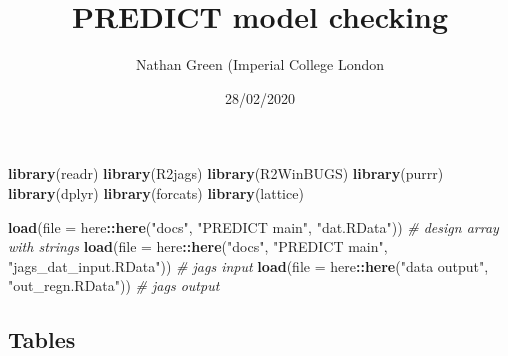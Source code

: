 \documentclass[]{article}
\title{PREDICT model checking}
\author{Nathan Green (Imperial College London}
\date{28/02/2020}
\newenvironment{Shaded}{\begin{snugshade}}{\end{snugshade}}
\newcommand{\CommentTok}[1]{\textcolor[rgb]{0.56,0.35,0.01}{\textit{#1}}}
\newcommand{\DataTypeTok}[1]{\textcolor[rgb]{0.13,0.29,0.53}{#1}}
\newcommand{\KeywordTok}[1]{\textcolor[rgb]{0.13,0.29,0.53}{\textbf{#1}}}
\newcommand{\NormalTok}[1]{#1}
\newcommand{\OperatorTok}[1]{\textcolor[rgb]{0.81,0.36,0.00}{\textbf{#1}}}
\newcommand{\StringTok}[1]{\textcolor[rgb]{0.31,0.60,0.02}{#1}}
\begin{document}
\maketitle

\begin{Shaded}
\begin{Highlighting}[]
\KeywordTok{library}\NormalTok{(readr)}
\KeywordTok{library}\NormalTok{(R2jags)}
\KeywordTok{library}\NormalTok{(R2WinBUGS)}
\KeywordTok{library}\NormalTok{(purrr)}
\KeywordTok{library}\NormalTok{(dplyr)}
\KeywordTok{library}\NormalTok{(forcats)}
\KeywordTok{library}\NormalTok{(lattice)}
\end{Highlighting}
\end{Shaded}

\begin{Shaded}
\begin{Highlighting}[]
\KeywordTok{load}\NormalTok{(}\DataTypeTok{file =}\NormalTok{ here}\OperatorTok{::}\KeywordTok{here}\NormalTok{(}\StringTok{"docs"}\NormalTok{, }\StringTok{"PREDICT main"}\NormalTok{, }\StringTok{"dat.RData"}\NormalTok{))              }\CommentTok{# design array with strings}
\KeywordTok{load}\NormalTok{(}\DataTypeTok{file =}\NormalTok{ here}\OperatorTok{::}\KeywordTok{here}\NormalTok{(}\StringTok{"docs"}\NormalTok{, }\StringTok{"PREDICT main"}\NormalTok{, }\StringTok{"jags_dat_input.RData"}\NormalTok{))   }\CommentTok{# jags input}
\KeywordTok{load}\NormalTok{(}\DataTypeTok{file =}\NormalTok{ here}\OperatorTok{::}\KeywordTok{here}\NormalTok{(}\StringTok{"data output"}\NormalTok{, }\StringTok{"out_regn.RData"}\NormalTok{))                  }\CommentTok{# jags output}
\end{Highlighting}
\end{Shaded}

\hypertarget{tables}{%
\subsection{Tables}\label{tables}}
\end{document}
